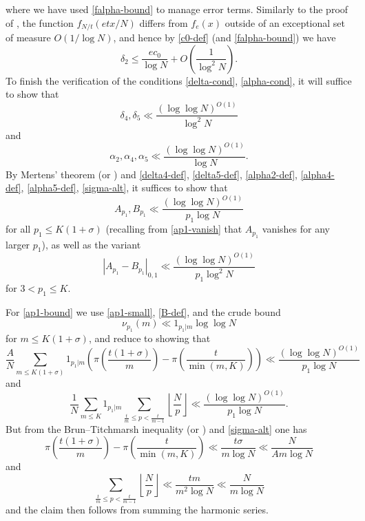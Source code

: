 \documentclass[10pt,a4paper,reqno]{amsart}
\numberwithin{equation}{section}
\theoremstyle{plain}
\theoremstyle{definition}
\begin{document}
where we have used \eqref{falpha-bound} to manage error terms.
Similarly to the proof of , the function $f_{N/t}(etx/N)$ differs from $f_e(x)$ outside of an exceptional set of measure $O(1/\log N)$, and hence by \eqref{c0-def} (and \eqref{falpha-bound}) we have
$$ \delta_2 \leq \frac{ec_0}{\log N} + O\left( \frac{1}{\log^2 N} \right).$$
To finish the verification of the conditions \eqref{delta-cond}, \eqref{alpha-cond}, it will suffice to show that
\begin{equation}\label{delta-remaining}
\delta_4, \delta_5 \ll \frac{(\log\log N)^{O(1)}}{\log^2 N}
\end{equation}
and
\begin{equation}\label{alpha-remaining}
\alpha_2, \alpha_4, \alpha_5 \ll \frac{(\log\log N)^{O(1)}}{\log N}.
\end{equation}
By Mertens' theorem (or ) and \eqref{delta4-def}, \eqref{delta5-def}, \eqref{alpha2-def}, \eqref{alpha4-def}, \eqref{alpha5-def}, \eqref{sigma-alt}, it suffices to show that
\begin{equation}\label{ap1-bound}
A_{p_1}, B_{p_1} \ll \frac{(\log\log N)^{O(1)}}{p_1 \log N}
\end{equation}
for all $p_1 \leq K(1+\sigma)$ (recalling from \eqref{ap1-vanish} that $A_{p_1}$ vanishes for any larger $p_1$), as well as the variant
\begin{equation}\label{ap1-diff}
  |A_{p_1}-B_{p_1}|_{0,1} \ll \frac{(\log\log N)^{O(1)}}{p_1 \log^2 N}
\end{equation}
for $3 < p_1 \leq K$.

For \eqref{ap1-bound} we use \eqref{ap1-small}, \eqref{B-def}, and the crude bound
\begin{equation}\label{crude}
  \nu_{p_1}(m) \ll 1_{p_1|m} \log\log N
\end{equation}
 for $m \leq K(1+\sigma)$, and reduce to showing that
$$ \frac{A}{N} \sum_{m \leq K(1+\sigma)} 1_{p_1|m} \left( \pi\left(\frac{t(1+\sigma)}{m}\right) - \pi\left(\frac{t}{\min(m,K)} \right) \right)
\ll \frac{(\log\log N)^{O(1)}}{p_1 \log N}$$
and
$$ \frac{1}{N} \sum_{m \leq K} 1_{p_1|m} \sum_{\frac{t}{m} \leq p < \frac{t}{m-1}} \left \lfloor \frac{N}{p} \right\rfloor \ll
\frac{(\log\log N)^{O(1)}}{p_1 \log N}.$$
But from the Brun--Titchmarsh inequality (or ) and \eqref{sigma-alt} one has
$$ \pi\left(\frac{t(1+\sigma)}{m}\right) - \pi\left(\frac{t}{\min(m,K)}\right) \ll \frac{t\sigma}{m \log N} \ll \frac{N}{Am \log N}$$
and
$$ \sum_{\frac{t}{m} \leq p < \frac{t}{m-1}} \left \lfloor \frac{N}{p} \right\rfloor \ll \frac{tm}{m^2 \log N} \ll \frac{N}{m \log N}$$
and the claim then follows from summing the harmonic series.
\end{document}
